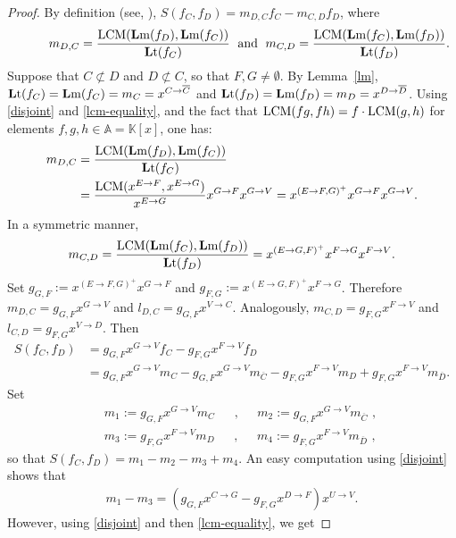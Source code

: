 \documentclass[ALCO]{cedram}
\newcommand{\mbk}{\mbox{$\mathbb{K}$}}
\newcommand{\mba}{\mbox{$\mathbb{A}$}}
\newcommand{\lm}{\mbox{${\bf L}{\rm m}$}}
\newcommand{\lt}{\mbox{${\bf L}{\rm t}$}}
\newcommand{\Lcm}{\mbox{${\rm LCM}$}}
\begin{document}
\begin{proof}
By definition (see, \eg \cite[\S~2.6, Definition~4]{clo}),
$S(f_C,f_D)=m_{D,C}f_C-m_{C,D}f_D$, where
\begin{eqnarray}\label{mdc}
\phantom{+++} m_{D,C}=\frac{\Lcm(\lm(f_D),\lm(f_C))}{\lt(f_C)}\;
\mbox{ and }\; m_{C,D}=\frac{\Lcm(\lm(f_C),\lm(f_D))}{\lt(f_D)}.
\end{eqnarray}
Suppose that $C\not\subset D$ and $D\not\subset C$, so that
$F,G\neq\emptyset$. By Lemma~\ref{lm},
$\lt(f_C)=\lm(f_C)=m_C=x^{C\to\overline{C}}$ and
$\lt(f_D)=\lm(f_D)=m_D=x^{D\to\overline{D}}$. Using \eqref{disjoint}
and \eqref{lcm-equality}, and the fact that $\Lcm(fg,fh)=f\cdot
\Lcm(g,h)$ for elements $f,g,h\in \mba=\mbk[x]$, one has:
\begin{align}\label{lcmCD/C}
m_{D,C} & =\frac{\Lcm(\lm(f_D),\lm(f_C))}{\lt(f_C)}\\ &=
  \frac{\Lcm(x^{E\to F},x^{E\to G})}{x^{E\to G}}x^{G\to F}x^{G\to
    V}=x^{(E\to F,G)^{+}}x^{G\to F}x^{G\to V}. \notag
\end{align}
In a symmetric manner,
\begin{eqnarray}\label{lcmCD/D}
m_{C,D}=\frac{\Lcm(\lm(f_C),\lm(f_D))}{\lt(f_D)}=x^{(E\to
  G,F)^{+}}x^{F\to G}x^{F\to V}.
\end{eqnarray}
Set $g_{G,F}:=x^{(E\to F,G)^{+}}x^{G\to F}$ and $g_{F,G}:=x^{(E\to
  G,F)^{+}}x^{F\to G}$. Therefore $m_{D,C}=g_{G,F}x^{G\to V}$ and
$l_{D,C}=g_{G,F}x^{V\to C}$. Analogously, $m_{C,D}=g_{F,G}x^{F\to V}$
and $l_{C,D}=g_{F,G}x^{V\to D}$. Then
\begin{align*}
 S(f_C,f_D)&=g_{G,F}x^{G\to V}f_C-g_{F,G}x^{F\to V}f_{D}\\
&= g_{G,F}x^{G\to V}m_C-g_{G,F}x^{G\to V}m_{\overline{C}}-
g_{F,G}x^{F\to V}m_{D}+g_{F,G}x^{F\to V}m_{\overline{D}}.
\end{align*}
Set
\begin{eqnarray*}
&&m_1:=g_{G,F}x^{G\to V}m_C\phantom{+}\mbox{ ,
  }\phantom{+}m_2:=g_{G,F}x^{G\to V}m_{\overline{C}}\mbox{ , }
  \\&&m_3:=g_{F,G}x^{F\to V}m_{D}\phantom{+}\mbox{ ,
  }\phantom{+}m_4:=g_{F,G}x^{F\to V}m_{\overline{D}}\mbox{ , }
\end{eqnarray*}
so that $S(f_C,f_D)=m_1-m_2-m_3+m_4$. An easy computation using
\eqref{disjoint} shows that
\begin{eqnarray*}
m_1-m_3=(g_{G,F}x^{C\to G}-g_{F,G}x^{D\to F})x^{U\to V}.
\end{eqnarray*}
However, using \eqref{disjoint} and then \eqref{lcm-equality}, we get

\end{proof}
\end{document}
